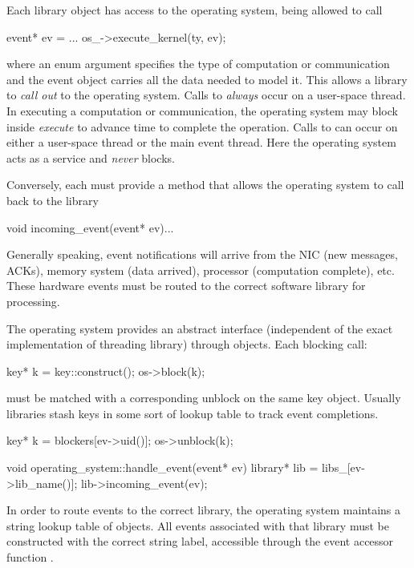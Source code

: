 Each library object has access to the operating system, being allowed to call

\begin{CppCode}
event* ev = ...
os_->execute_kernel(ty, ev);
\end{CppCode}
where an enum argument  specifies the type of computation or communication and the event object carries all the data needed to model it.
This allows a library to \emph{call out} to the operating system.
Calls to  \emph{always} occur on a user-space thread. 
In executing a computation or communication, the operating system may block inside \emph{execute} to advance time to complete the operation.
Calls to  can occur on either a user-space thread or the main event thread.
Here the operating system acts as a service and \emph{never} blocks.

Conversely, each  must provide a  method that allows the operating system to call back to the library

\begin{CppCode}
void incoming_event(event* ev){...}
\end{CppCode}
Generally speaking, event notifications will arrive from the NIC (new messages, ACKs), memory system (data arrived), processor (computation complete), etc.
These hardware events must be routed to the correct software library for processing.

The operating system provides an abstract interface (independent of the exact implementation of threading library) through  objects.
Each blocking call:

\begin{CppCode}
key* k = key::construct();
os->block(k);
\end{CppCode}

must be matched with a corresponding unblock on the same key object.
Usually libraries stash keys in some sort of lookup table to track event completions.

\begin{CppCode}
key* k = blockers[ev->uid()];
os->unblock(k);
\end{CppCode}

\begin{CppCode}
void operating_system::handle_event(event* ev) {
  library* lib = libs_[ev->lib_name()];
  lib->incoming_event(ev);
}
\end{CppCode}
In order to route events to the correct library, the operating system maintains a string lookup table of  objects.
All events associated with that library must be constructed with the correct string label, 
accessible through the event accessor function .

